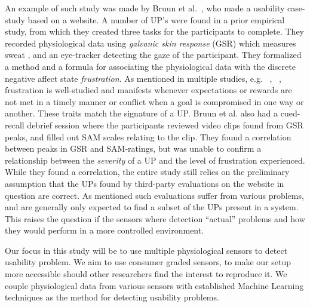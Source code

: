 An example of such study was made by Bruun et al.~\cite{LH-paper}, who made a usability case-study based on a website.
A number of UP's were found in a prior empirical study, from which they created three tasks for the participants to complete.
They recorded physiological data using \textit{galvanic skin response} (GSR) which measures sweat \cite{gsr_calibration}, and an eye-tracker detecting the gaze of the participant.
They formalized a method and a formula for associating the physiological data with the discrete negative affect state \textit{frustration}.
As mentioned in multiple studies, e.g. ~\cite{LH-paper}, ~\cite{frustration_with_computers}, frustration is well-studied
and manifests whenever expectations or rewards are not met in a timely manner or conflict when a goal is compromised in one way or another. These traits match the signature of a UP.
Bruun et al. also had a cued-recall debrief session where the participants reviewed video clips found from GSR peaks, and filled out SAM scales relating to the clip. 
They found a correlation between peaks in GSR and SAM-ratings, but was unable to confirm a relationship between the
\textit{severity} of a UP and the level of frustration experienced.
While they found a correlation, the entire study still relies on the preliminary assumption that the UPs found by
third-party evaluations on the website in question are correct. 
As mentioned such evaluations suffer from various problems, and are generally only expected to find a subset of the UPs present in a system. 
This raises the question if the sensors where detection ``actual'' problems and how they would perform in a more controlled environment.

Our focus in this study will be to use multiple physiological sensors to detect usability problem. We aim to use
consumer graded sensors, to make our setup more accessible should other researchers find the interest to reproduce
it. We couple physiological data from various sensors with established Machine Learning techniques as the method for
detecting usability problems.